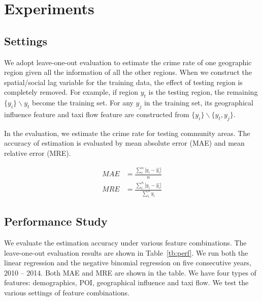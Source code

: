 \section{Experiments}
\label{sec:experiment}


\subsection{Settings}


We adopt leave-one-out evaluation to estimate the crime rate of one geographic region given all the information of all the other regions. When we construct the spatial/social lag variable for the training data, the effect of testing region is completely removed. For example, if region $y_t$ is the testing region, the remaining $\{y_i\} \backslash y_t$ become the training set. For any $y_j$ in the training set, its geographical influence feature and taxi flow feature are constructed from $\{y_i\} \backslash \{y_t, y_j\}$.


In the evaluation, we estimate the crime rate for testing community areas. The accuracy of estimation is evaluated by mean absolute error (MAE) and mean relative error (MRE).

\begin{align}
MAE & = \frac{\sum_i^n |y_i - \hat{y_i}| }{n} \\
MRE & = \frac{\sum_i^n |y_i - \hat{y_i}|} {\sum_i^n y_i }
\end{align}







\subsection{Performance Study}


We evaluate the estimation accuracy under various feature combinations. The leave-one-out evaluation results are shown in Table~\ref{tb:perf}.  We run both the linear regression and the negative binomial regression on five consecutive years, 2010 -- 2014. Both MAE and MRE are shown in the table. We have four types of features: demographics, POI, geographical influence and taxi flow. We test the various settings of feature combinations.





